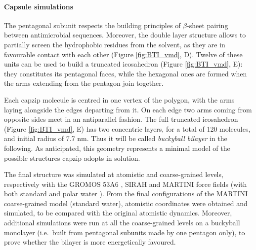 \paragraph{Capsule simulations} The pentagonal subunit respects the building principles of $\beta$-sheet pairing between antimicrobial sequences. Moreover, the double layer structure allows to partially screen the hydrophobic residues from the solvent, as they are in favourable contact with each other (Figure \ref{fig:BTI_vmd}, D).
%
Twelve of these units can be used to build a truncated icosahedron (Figure \ref{fig:BTI_vmd}, E): they constitutes its pentagonal faces, while the hexagonal ones are formed when the arms extending from the pentagon join together.

Each capzip molecule is centred in one vertex of the polygon, with the arms laying alongside the edges departing from it. On each edge two arms coming from opposite sides meet in an antiparallel fashion.%
%
The full truncated icosahedron (Figure \ref{fig:BTI_vmd}, E) has two concentric layers, for a total of 120 molecules, and initial radius of 7.7 nm. Thus it will be called \emph{buckyball bilayer} in the following.
%
As anticipated, this geometry represents a minimal model of the possible structures capzip adopts in solution.

The final structure was simulated at atomistic and coarse-grained levels, respectively with the GROMOS 53A6 \citep{Oostenbrink2004}, SIRAH \citep{Machado2018} and MARTINI \citep{Marrink2007, Monticelli2008} force fields (with both standard and polar water \citep{Yesylevskyy2010}).
From the final configurations of the MARTINI coarse-grained model (standard water), atomistic coordinates were obtained and simulated, to be compared with the original atomistic dynamics.
%
Moreover, additional simulations were run at all the coarse-grained levels on a buckyball monolayer (i.e.\ built from pentagonal subunits made by one pentagon only), to prove whether the bilayer is more energetically favoured.

